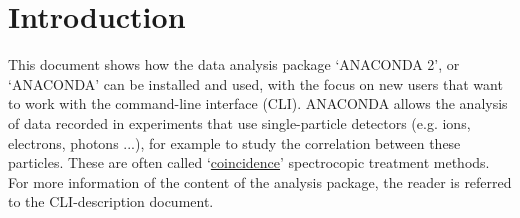 \section{Introduction}

This document shows how the data analysis package `ANACONDA 2', or `ANACONDA' can be installed and used, with the focus on new users that want to work with the command-line interface (CLI). ANACONDA allows the analysis of data recorded in experiments that use single-particle detectors (e.g. ions, electrons, photons ...), for example to study the correlation between these particles. These are often called `\href{https://en.wikipedia.org/wiki/Photoelectron_photoion_coincidence_spectroscopy}{coincidence}' spectrocopic treatment methods. For more information of the content of the analysis package, the reader is referred to the CLI-description document.
